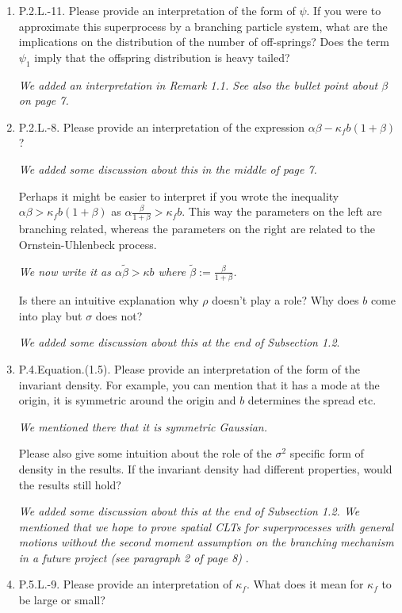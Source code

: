 \documentclass[12pt,a4paper]{amsart}
\begin{document}
\begin{enumerate}
\item
  P.2.L.-11.
  Please provide an interpretation of the form of $\psi$.
  If you were to approximate this superprocess by a branching particle system, what are the implications on the distribution of the number of off-springs?
  Does the term $\psi_1$ imply that the offspring distribution is heavy tailed?

  \emph{We added an interpretation in Remark 1.1.
   See also the bullet point about $\beta$ on page 7.
    }
\item
  P.2.L.-8.
   Please provide an interpretation of the expression $\alpha\beta - \kappa_f b(1+\beta)$?

\emph{We added some discussion about this in the middle of page 7.}

  Perhaps it might be easier to interpret if you wrote the inequality $\alpha \beta > \kappa_f b(1 + \beta)$ as $\alpha \frac{\beta}{1+\beta} > \kappa_f b$.
  This way the parameters on the left are branching related, whereas the parameters on the right are related to the Ornstein-Uhlenbeck process.

  \emph{We now write it as $\alpha \tilde \beta > \kappa b$ where $\tilde \beta := \frac{\beta}{1+\beta}$.}

  Is there an intuitive explanation why $\rho$ doesn't play a role?
  Why does $b$ come into play but $\sigma$ does not?

  \emph{We added some discussion about this at the end of Subsection 1.2}.
\item
  P.4.Equation.(1.5).
  Please provide an interpretation of the form of the invariant density.
  For example, you can mention that it has a mode at the origin, it is symmetric around the origin and $b$ determines the spread etc.

\emph{We mentioned there that it is symmetric Gaussian.}

  Please also give some intuition about the role of the $\sigma^2$ specific form of density in the results.
  If the invariant density had different properties, would the results still hold?

  \emph{We added some discussion about this at the end of Subsection 1.2.
We mentioned that we hope to prove spatial CLTs for superprocesses with general motions without the second moment assumption
on the branching mechanism in a future project (see paragraph 2 of page 8)
}.
\item
  P.5.L.-9.
  Please provide an interpretation of $\kappa_f$.
  What does it mean for $\kappa_f$ to be large or small?


\end{enumerate}
\end{document}
